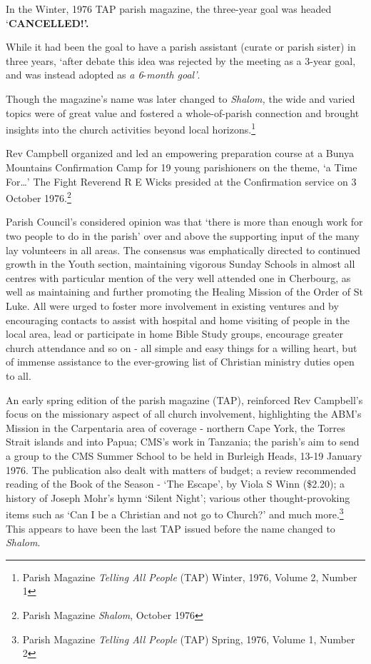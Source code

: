 In the Winter, 1976 TAP parish magazine, the three-year goal was headed `\textbf{CANCELLED!'.}

While it had been the goal to have a parish assistant (curate or parish sister) in three years, `after debate this idea was rejected by the meeting as a 3-year goal, and was instead adopted as \emph{a 6}-\emph{month goal'}.

Though the magazine's name was later changed to \emph{Shalom,} the wide and varied topics were of great value and fostered a whole-of-parish connection and brought insights into the church activities beyond local horizons.\footnote{Parish Magazine \emph{Telling All People} (TAP) Winter, 1976, Volume 2, Number 1}

Rev Campbell organized and led an empowering preparation course at a Bunya Mountains Confirmation Camp for 19 young parishioners on the theme, `a Time For\ldots' The Fight Reverend R E Wicks presided at the Confirmation service on 3 October 1976.\footnote{Parish Magazine \emph{Shalom}, October 1976}

Parish Council's considered opinion was that `there is more than enough work for two people to do in the parish' over and above the supporting input of the many lay volunteers in all areas. The consensus was emphatically directed to continued growth in the Youth section, maintaining vigorous Sunday Schools in almost all centres with particular mention of the very well attended one in Cherbourg, as well as maintaining and further promoting the Healing Mission of the Order of St Luke. All were urged to foster more involvement in existing ventures and by encouraging contacts to assist with hospital and home visiting of people in the local area, lead or participate in home Bible Study groups, encourage greater church attendance and so on - all simple and easy things for a willing heart, but of immense assistance to the ever-growing list of Christian ministry duties open to all.

An early spring edition of the parish magazine (TAP), reinforced Rev Campbell's focus on the missionary aspect of all church involvement, highlighting the ABM's Mission in the Carpentaria area of coverage - northern Cape York, the Torres Strait islands and into Papua; CMS's work in Tanzania; the parish's aim to send a group to the CMS Summer School to be held in Burleigh Heads, 13-19 January 1976. The publication also dealt with matters of budget; a review recommended reading of the Book of the Season - `The Escape', by Viola S Winn (\$2.20); a history of Joseph Mohr's hymn `Silent Night'; various other thought-provoking items such as `Can I be a Christian and not go to Church?' and much more.\footnote{Parish Magazine \emph{Telling All People} (TAP) Spring, 1976, Volume 1, Number 2} This appears to have been the last TAP issued before the name changed to \emph{Shalom}.


